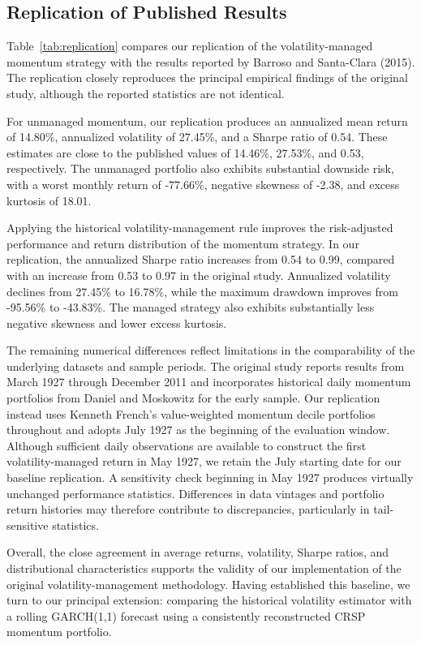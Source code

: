 \documentclass[11pt]{article}
\begin{document}
\subsection{Replication of Published Results}
\label{sec:replication}



Table~\ref{tab:replication} compares our replication of the
volatility-managed momentum strategy with the results reported
by Barroso and Santa-Clara (2015). The replication closely
reproduces the principal empirical findings of the original
study, although the reported statistics are not identical.

For unmanaged momentum, our replication produces an annualized
mean return of 14.80\%, annualized volatility of 27.45\%, and
a Sharpe ratio of 0.54. These estimates are close to the
published values of 14.46\%, 27.53\%, and 0.53, respectively.
The unmanaged portfolio also exhibits substantial downside
risk, with a worst monthly return of -77.66\%, negative
skewness of -2.38, and excess kurtosis of 18.01.

Applying the historical volatility-management rule improves
the risk-adjusted performance and return distribution of the
momentum strategy. In our replication, the annualized Sharpe
ratio increases from 0.54 to 0.99, compared with an increase
from 0.53 to 0.97 in the original study. Annualized volatility
declines from 27.45\% to 16.78\%, while the maximum drawdown
improves from -95.56\% to -43.83\%. The managed strategy also
exhibits substantially less negative skewness and lower excess
kurtosis.

The remaining numerical differences reflect limitations in
the comparability of the underlying datasets and sample
periods. The original study reports results from March 1927
through December 2011 and incorporates historical daily
momentum portfolios from Daniel and Moskowitz for the early
sample. 
Our replication instead uses Kenneth French's
value-weighted momentum decile portfolios throughout
and adopts July 1927 as the beginning of the
evaluation window. Although sufficient daily
observations are available to construct the first
volatility-managed return in May 1927, we retain
the July starting date for our baseline replication.
A sensitivity check beginning in May 1927 produces
virtually unchanged performance statistics.
 Differences
in data vintages and portfolio return histories may therefore
contribute to discrepancies, particularly in tail-sensitive
statistics.

Overall, the close agreement in average returns, volatility,
Sharpe ratios, and distributional characteristics supports
the validity of our implementation of the original
volatility-management methodology. Having established this
baseline, we turn to our principal extension: comparing the
historical volatility estimator with a rolling GARCH(1,1)
forecast using a consistently reconstructed CRSP momentum
portfolio.
\end{document}

